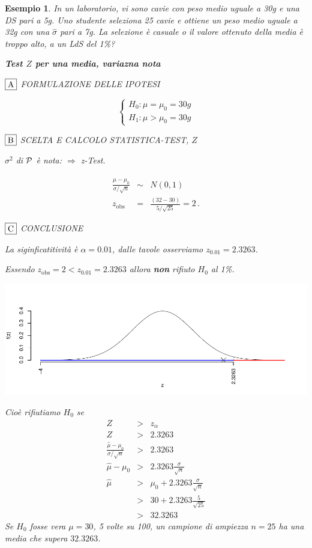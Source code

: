 \documentclass[
  11pt,
]{book}
\theoremstyle{mytheoremstyle}
\theoremstyle{mydefstyle}
\newtheorem{example}{{Esempio}}[section]
\begin{document}
\begin{example}
In un laboratorio, vi sono cavie con peso medio uguale a 30g e una DS
pari a 5g. Uno studente seleziona 25 cavie e ottiene un peso medio
uguale a 32g con una \(\hat\sigma\) pari a 7g. La selezione è casuale o il
valore ottenuto della media è troppo alto, a un LdS del 1\%?

\textbf{Test \(Z\) per una media, variazna nota}

\(\fbox{A}\) FORMULAZIONE DELLE IPOTESI

\[\begin{cases}
   H_0: \mu = \mu_0=30g \\
   H_1: \mu > \mu_0=30g 
   \end{cases}\]

\(\fbox{B}\) SCELTA E CALCOLO STATISTICA-TEST, \(Z\)

\(\sigma^{2}\) di \(\cal{P}\) è nota: \(\Rightarrow\) z-Test.

\begin{eqnarray*}
   \frac{\hat\mu - \mu_{0}} {\sigma/\sqrt{n}}&\sim&N(0,1)\\
   z_{\text{obs}}
   &=& \frac{ ( 32 -  30 )} { 5 /\sqrt{ 25 }}
   =   2 \, .
   \end{eqnarray*}

\(\fbox{C}\) CONCLUSIONE

La siginficatitività è \(\alpha=0.01\), dalle tavole osserviamo \(z_{0.01}=2.3263\).

Essendo \(z_\text{obs}=2<z_{0.01}=2.3263\) allora \textbf{non} rifiuto \(H_0\) al 1\%.

\begin{center}\includegraphics{Appunti_di_Statistica_2025_files/figure-latex/15-test-mu-pi-2-1} \end{center}

Cioè rifiutiamo \(H_0\) se
\begin{eqnarray*}
Z &>& z_\alpha \\
Z &>& 2.3263 \\
   \frac{\hat\mu - \mu_{0}} {\sigma/\sqrt{n}}&>&2.3263 \\
   \hat\mu - \mu_{0} &>&2.3263\frac\sigma{\sqrt{n}} \\
   \hat\mu &>& \mu_{0} + 2.3263\frac\sigma{\sqrt{n}} \\   
   &>&   30 + 2.3263\frac 5{ \sqrt{ 25 }}\\
   &>&   32.3263
   \end{eqnarray*}
Se \(H_0\) fosse vera \(\mu=30\), 5 volte su 100, un campione di ampiezza \(n=25\)
ha una media che supera \(32.3263\).
\end{example}
\end{document}
